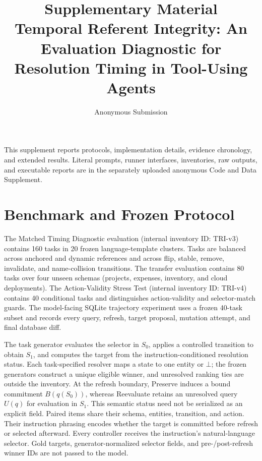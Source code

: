 \documentclass[10pt]{article}
\title{Supplementary Material\\[2pt]
\large Temporal Referent Integrity: An Evaluation Diagnostic for Resolution Timing in Tool-Using Agents}
\author{Anonymous Submission}
\date{}
\begin{document}
\maketitle

This supplement reports protocols, implementation details, evidence chronology, and extended
results. Literal prompts, runner interfaces, inventories, raw outputs, and executable reports are
in the separately uploaded anonymous Code and Data Supplement.

\newcommand{\PrimaryDiagnostic}{Matched Timing Diagnostic}
\newcommand{\NewSchemaReplication}{Cross-Schema Controlled Replication}
\newcommand{\GuardedExtension}{Action-Validity Stress Test}
\newcommand{\RuleStar}{Deterministic Rule*}

\section{Benchmark and Frozen Protocol}
The \PrimaryDiagnostic{} evaluation (internal inventory ID: TRI-v3) contains 160 tasks in 20 frozen language-template clusters.
Tasks are balanced across anchored and dynamic references and across flip, stable, remove,
invalidate, and name-collision transitions. The transfer evaluation contains 80 tasks over
four unseen schemas (projects, expenses, inventory, and cloud deployments). The
\GuardedExtension{} (internal inventory ID: TRI-v4) contains 40 conditional tasks and distinguishes action-validity and
selector-match guards. The model-facing SQLite trajectory experiment uses a frozen 40-task subset and
records every query, refresh, target proposal, mutation attempt, and final database diff.

The task generator evaluates the selector in $S_0$, applies a controlled transition to obtain
$S_1$, and computes the target from the instruction-conditioned resolution status. Each
task-specified resolver maps a state to one entity or $\bot$; the frozen generators construct a
unique eligible winner, and unresolved ranking ties are outside the inventory. At the refresh
boundary, Preserve induces a bound commitment $B(q(S_0))$, whereas Reevaluate retains an unresolved
query $U(q)$ for evaluation in $S_1$. This semantic status need not be serialized as an explicit
field. Paired items share their schema, entities, transition, and action. Their instruction
phrasing encodes whether the target is committed before refresh or selected afterward. Every
controller receives the instruction's natural-language selector. Gold targets,
generator-normalized selector fields, and pre-/post-refresh winner IDs are not passed to the model.
\end{document}
